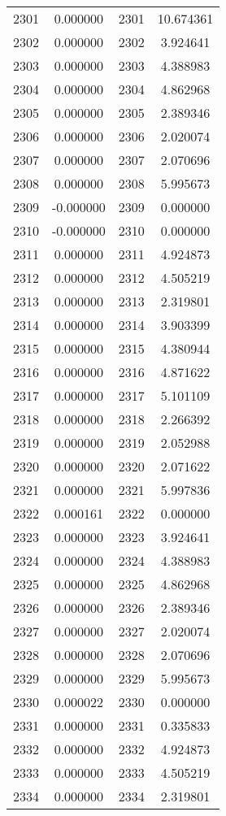 \documentclass[12pt]{article}
\begin{document}
\begin{longtable}{@{}cccc@{}}
2301 & 0.000000 & 2301 & 10.674361 \\
2302 & 0.000000 & 2302 & 3.924641 \\
2303 & 0.000000 & 2303 & 4.388983 \\
2304 & 0.000000 & 2304 & 4.862968 \\
2305 & 0.000000 & 2305 & 2.389346 \\
2306 & 0.000000 & 2306 & 2.020074 \\
2307 & 0.000000 & 2307 & 2.070696 \\
2308 & 0.000000 & 2308 & 5.995673 \\
2309 & -0.000000 & 2309 & 0.000000 \\
2310 & -0.000000 & 2310 & 0.000000 \\
2311 & 0.000000 & 2311 & 4.924873 \\
2312 & 0.000000 & 2312 & 4.505219 \\
2313 & 0.000000 & 2313 & 2.319801 \\
2314 & 0.000000 & 2314 & 3.903399 \\
2315 & 0.000000 & 2315 & 4.380944 \\
2316 & 0.000000 & 2316 & 4.871622 \\
2317 & 0.000000 & 2317 & 5.101109 \\
2318 & 0.000000 & 2318 & 2.266392 \\
2319 & 0.000000 & 2319 & 2.052988 \\
2320 & 0.000000 & 2320 & 2.071622 \\
2321 & 0.000000 & 2321 & 5.997836 \\
2322 & 0.000161 & 2322 & 0.000000 \\
2323 & 0.000000 & 2323 & 3.924641 \\
2324 & 0.000000 & 2324 & 4.388983 \\
2325 & 0.000000 & 2325 & 4.862968 \\
2326 & 0.000000 & 2326 & 2.389346 \\
2327 & 0.000000 & 2327 & 2.020074 \\
2328 & 0.000000 & 2328 & 2.070696 \\
2329 & 0.000000 & 2329 & 5.995673 \\
2330 & 0.000022 & 2330 & 0.000000 \\
2331 & 0.000000 & 2331 & 0.335833 \\
2332 & 0.000000 & 2332 & 4.924873 \\
2333 & 0.000000 & 2333 & 4.505219 \\
2334 & 0.000000 & 2334 & 2.319801 \\

\end{longtable}
\end{document}
